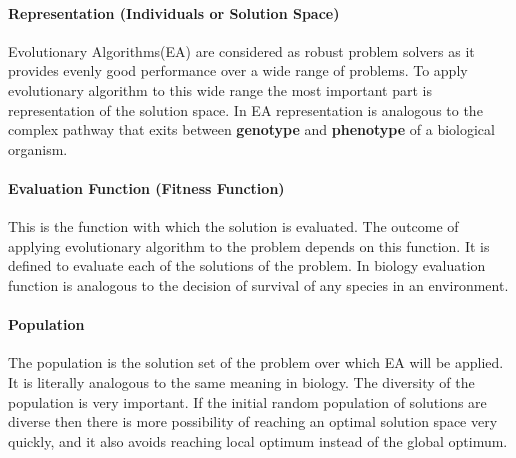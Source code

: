 \paragraph{Representation (Individuals or Solution Space)}
Evolutionary Algorithms(EA) are considered as robust problem solvers as it provides evenly good performance over a wide range of problems. To apply evolutionary algorithm to this wide range the most important part is representation of the solution space. In EA representation is analogous to the complex pathway that exits between \textbf{genotype} and \textbf{phenotype} of a biological organism.

\paragraph{Evaluation Function (Fitness Function)}
This is the function with which the solution is evaluated. The outcome of applying evolutionary algorithm to the problem depends on this function. It is defined to evaluate each of the solutions of the problem. In biology evaluation function is analogous to the decision of survival of any species in an environment. 

\paragraph{Population}
The population is the solution set of the problem over which EA will be applied. It is literally analogous to the same meaning in biology. The diversity of the population is very important. If the initial random population of solutions are diverse then there is more possibility of reaching an optimal solution space very quickly, and it also avoids reaching local optimum instead of the global optimum.

